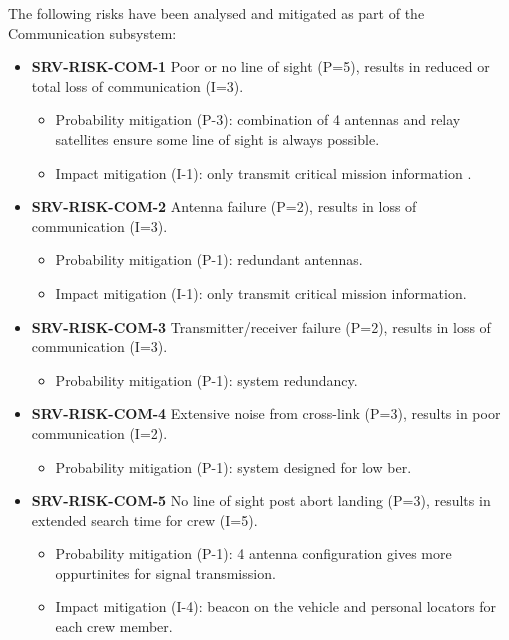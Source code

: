 \noindent The following risks have been analysed and mitigated as part of the Communication subsystem:

\begin{itemize}
	 \item \textbf{SRV-RISK-COM-1} Poor or no line of sight (P=5), results in reduced or total loss of communication (I=3).
	\begin{itemize}
		 \item Probability mitigation (P-3):  combination of 4 antennas and relay satellites ensure some line of sight is always possible.		 \item Impact mitigation (I-1):  only transmit critical mission information .	\end{itemize}
	 \item \textbf{SRV-RISK-COM-2} Antenna failure (P=2), results in loss of communication (I=3).
	\begin{itemize}
		 \item Probability mitigation (P-1):  redundant antennas.		 \item Impact mitigation (I-1):  only transmit critical mission information.	\end{itemize}
	 \item \textbf{SRV-RISK-COM-3} Transmitter/receiver failure (P=2), results in loss of communication (I=3).
	\begin{itemize}
		 \item Probability mitigation (P-1):  system redundancy.	\end{itemize}
	 \item \textbf{SRV-RISK-COM-4} Extensive noise from cross-link (P=3), results in poor communication (I=2).
	\begin{itemize}
		 \item Probability mitigation (P-1):  system designed for low ber.	\end{itemize}
	 \item \textbf{SRV-RISK-COM-5} No line of sight post abort landing (P=3), results in extended search time for crew (I=5).
	\begin{itemize}
		 \item Probability mitigation (P-1):  4 antenna configuration gives more oppurtinites for signal transmission.		 \item Impact mitigation (I-4):  beacon on the vehicle and personal locators for each crew member.	\end{itemize}
\end{itemize}


